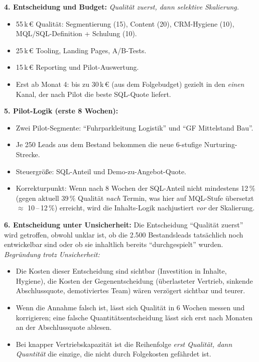 \documentclass[11pt,a4paper,oneside]{article}
\begin{document}
\begin{loesungbox}
\smallskip
\textbf{4. Entscheidung und Budget:}
\emph{Qualität zuerst, dann selektive Skalierung.}
\begin{itemize}
  \item 55\,k\,\euro{} Qualität: Segmentierung (15), Content (20), CRM-Hygiene (10), MQL/SQL-Definition + Schulung (10).
  \item 25\,k\,\euro{} Tooling, Landing Pages, A/B-Tests.
  \item 15\,k\,\euro{} Reporting und Pilot-Auswertung.
  \item Erst ab Monat 4: bis zu 30\,k\,\euro{} (aus dem Folgebudget) gezielt in den \emph{einen} Kanal, der nach Pilot die beste SQL-Quote liefert.
\end{itemize}

\smallskip
\textbf{5. Pilot-Logik (erste 8 Wochen):}
\begin{itemize}
  \item Zwei Pilot-Segmente: ``Fuhrparkleitung Logistik'' und ``GF Mittelstand Bau''.
  \item Je 250 Leads aus dem Bestand bekommen die neue 6-stufige Nurturing-Strecke.
  \item Steuergröße: SQL-Anteil und Demo-zu-Angebot-Quote.
  \item Korrekturpunkt: Wenn nach 8 Wochen der SQL-Anteil nicht mindestens 12\,\% (gegen aktuell 39\,\% Qualität \emph{nach} Termin, was hier auf MQL-Stufe übersetzt $\approx$ 10\,--\,12\,\%) erreicht, wird die Inhalts-Logik nachjustiert \emph{vor} der Skalierung.
\end{itemize}

\smallskip
\textbf{6. Entscheidung unter Unsicherheit:}
Die Entscheidung ``Qualität zuerst'' wird getroffen, obwohl unklar ist, ob die 2.500 Bestandsleads tatsächlich noch entwickelbar sind \textendash{} oder ob sie inhaltlich bereits ``durchgespielt'' wurden. \emph{Begründung trotz Unsicherheit:}
\begin{itemize}
  \item Die Kosten dieser Entscheidung sind sichtbar (Investition in Inhalte, Hygiene), die Kosten der Gegenentscheidung (überlasteter Vertrieb, sinkende Abschlussquote, demotiviertes Team) wären verzögert sichtbar \textendash{} und teurer.
  \item Wenn die Annahme falsch ist, lässt sich Qualität in 6 Wochen messen und korrigieren; eine falsche Quantitätsentscheidung lässt sich erst nach Monaten an der Abschlussquote ablesen.
  \item Bei knapper Vertriebskapazität ist die Reihenfolge \emph{erst Qualität, dann Quantität} die einzige, die nicht durch Folgekosten gefährdet ist.
\end{itemize}
\end{loesungbox}
\end{document}
